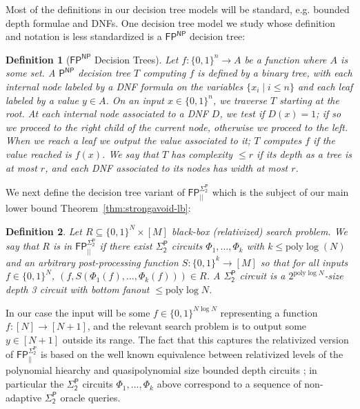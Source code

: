 \documentclass[11pt]{article}
\newtheorem{definition}{Definition}
\newcommand{\B}{\{0,1\}}
\newcommand{\poly}{\mathrm{poly}}
\begin{document}
Most of the definitions in our decision tree models will be standard, e.g. bounded depth formulae and DNFs.
One decision tree model we study whose definition and notation is less standardized is a $\mathsf{FP^{NP}}$ decision tree:
\begin{definition}[$\mathsf{FP^{NP}}$ Decision Trees]
\label{def:PNP-trees}
Let $f: \B^n \to A$ be a function where $A$ is some set. A $\mathsf{P^{NP}}$ decision tree $T$ computing $f$ is defined by a binary tree, with each internal node labeled by a DNF formula on the variables $\{x_i \mid i \leq n\}$ and each leaf labeled by a value $y \in A$. On an input $x \in \B^n$, we traverse $T$ starting at the root. At each internal node associated to a DNF $D$, we test if $D(x)=1$; if so we proceed to the right child of the current node, otherwise we proceed to the left. When we reach a leaf we output the value associated to it; $T$ computes $f$ if the value reached is $f(x)$. We say that $T$ has complexity $\leq r$ if its depth as a tree is at most $r$, and each DNF associated to its nodes has width at most $r$.
\end{definition}

We next define the decision tree variant of $\mathsf{FP^{\Sigma_2^P}_{||}}$ which is the subject of our main lower bound Theorem~\ref{thm:strongavoid-lb}:
\begin{definition}\label{def:sigma-parallel}
Let $R \subseteq \B^{N} \times [M]$ black-box (relativized) search problem. We say that $R$ is in $\mathsf{FP^{\Sigma_2^P}_{||}}$ if there exist $\mathsf{\Sigma_2^P}$ circuits $\Phi_1,\ldots,\Phi_k$ with $k \leq \poly\log(N)$ and an arbitrary post-processing function $S: \B^k \to [M]$ so that for all inputs $f \in \B^N$, $(f, S(\Phi_1(f),\ldots,\Phi_k(f))) \in R$. A $\mathsf{\Sigma_2^P}$ circuit is a $2^{\poly\log N}$-size depth 3 circuit with bottom fanout $\leq \poly\log N$.
\end{definition}

In our case the input will be some $f \in \B^{N\log N}$ representing a function $f: [N] \to [N+1]$, and the relevant search problem is to output some $y \in [N+1]$ outside its range. The fact that this captures the relativized version of $\mathsf{FP^{\Sigma_2^P}_{||}}$ is based on the well known equivalence between relativized levels of the polynomial hiearchy and quasipolynomial size bounded depth circuits \cite{FSS}; in particular the $\mathsf{\Sigma_2^P}$ circuits $\Phi_1,\ldots,\Phi_k$ above correspond to a sequence of non-adaptive $\mathsf{\Sigma_2^P}$ oracle queries.
\end{document}
